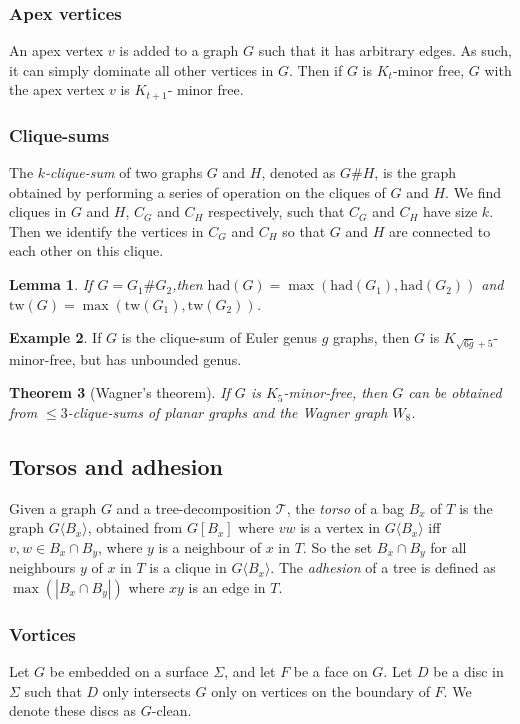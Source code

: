 \documentclass[]{article}
\newcommand{\tree}{\mathcal{T}}
\newcommand{\tw}{\text{tw}}
\newcommand{\had}{\text{had}}
\newtheorem{theorem}{Theorem}
\newtheorem{lemma}[theorem]{Lemma}
\theoremstyle{definition}
\newtheorem{example}[theorem]{Example}
\numberwithin{theorem}{section}
\numberwithin{equation}{section}
\begin{document}
\subsubsection{Apex vertices}
An apex vertex $v$ is added to a graph $G$ such that it has arbitrary edges. As such, it can simply dominate all other vertices in $G$. Then if $G$ is $K_t$-minor free, $G$ with the apex vertex $v$ is $K_{t+1}$- minor free. 
\subsubsection{Clique-sums}
The \textit{$k$-clique-sum} of two graphs $G$ and $H$, denoted as $G \# H$, is the graph obtained by performing a series of operation on the cliques of $G$ and $H$. We find cliques in $G$ and $H$, $C_G$ and $C_H$ respectively, such that $C_G$ and $C_H$ have size $k$. Then we identify the vertices in $C_G$ and $C_H$ so that $G$ and $H$ are connected to each other on this clique. 

\begin{lemma}
	If $G = G_1 \# G_2$,then $\had(G) = \max(\had(G_1), \had(G_2))$ and $\tw(G) = \max(\tw(G_1), \tw(G_2))$.
\end{lemma}

\begin{example}
	If $G$ is the clique-sum of Euler genus $g$ graphs, then $G$ is $K_{\sqrt{6g} + 5}$-minor-free, but has unbounded genus.
\end{example}

\begin{theorem}[Wagner's theorem]
	If $G$ is $K_5$-minor-free, then $G$ can be obtained from $\leq 3$-clique-sums of planar graphs and the Wagner graph $W_8$.
\end{theorem}


\subsection{Torsos and adhesion}
Given a graph $G$ and a tree-decomposition $\tree$, the \textit{torso} of a bag $B_x$ of $T$ is the graph $G\langle B_x \rangle$, obtained from $G[B_x]$ where $vw$ is a vertex in $G\langle B_x \rangle$ iff $v,w \in B_x \cap B_y$, where $y$ is a neighbour of $x$ in $T$. So the set $B_x \cap B_y$ for all neighbours $y$ of $x$ in $T$ is a clique in $G\langle B_x \rangle$. 
The \textit{adhesion} of a tree is defined as $\max(|B_x \cap B_y|)$ where $xy$ is an edge in $T$.

\subsubsection{Vortices}
Let $G$ be embedded on a surface $\Sigma$, and let $F$ be a face on $G$. Let $D$ be a disc in $\Sigma$ such that $D$ only intersects $G$ only on vertices on the boundary of $F$. We denote these discs as $G$-clean. 
\end{document}
